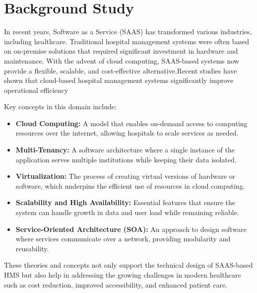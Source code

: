 \section{Background Study}
In recent years, Software as a Service (SAAS) has transformed various industries, including healthcare. Traditional hospital management systems were often based on on-premise solutions that required significant investment in hardware and maintenance. With the advent of cloud computing, SAAS-based systems now provide a flexible, scalable, and cost-effective alternative.Recent studies have shown that cloud-based hospital management systems significantly improve operational efficiency \cite{smith2018cloud, doe2020digital}

Key concepts in this domain include:
\begin{itemize}
  \item \textbf{Cloud Computing:} A model that enables on-demand access to computing resources over the internet, allowing hospitals to scale services as needed.
  \item \textbf{Multi-Tenancy:} A software architecture where a single instance of the application serves multiple institutions while keeping their data isolated.
  \item \textbf{Virtualization:} The process of creating virtual versions of hardware or software, which underpins the efficient use of resources in cloud computing.
  \item \textbf{Scalability and High Availability:} Essential features that ensure the system can handle growth in data and user load while remaining reliable.
  \item \textbf{Service-Oriented Architecture (SOA):} An approach to design software where services communicate over a network, providing modularity and reusability.
\end{itemize}

These theories and concepts not only support the technical design of SAAS-based HMS but also help in addressing the growing challenges in modern healthcare such as cost reduction, improved accessibility, and enhanced patient care.

